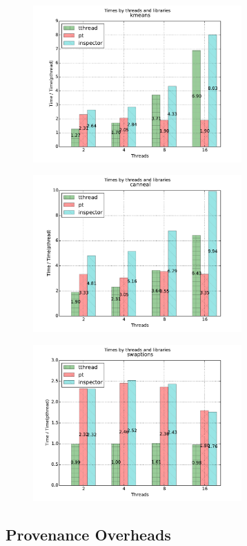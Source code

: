 \begin{figure}[h]
\includegraphics[width=8cm]{figure/kmeans.pdf}
\end{figure}

\begin{figure}[h]
\includegraphics[width=8cm]{figure/canneal.pdf}
\end{figure}

\begin{figure}[h]
\includegraphics[width=8cm]{figure/swaptions.pdf}
\end{figure}

%

\subsection{Provenance Overheads}



